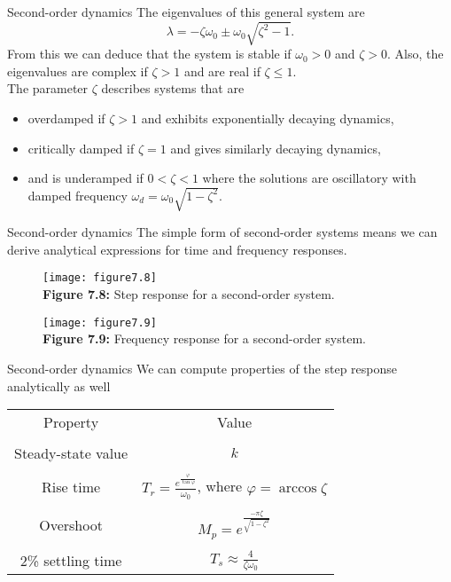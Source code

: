 \documentclass{beamer-control}
\begin{document}
\begin{frame}{Second-order dynamics}
The eigenvalues of this general system are 
\[\lambda=-\zeta \omega_0 \pm \omega_0 \sqrt{\zeta^2-1}.\]	
From this we can deduce that the system is stable if $\omega_0>0$ and $\zeta>0$. Also, the eigenvalues are complex if $\zeta>1$ and are real if $\zeta\leq 1$.\\

The parameter $\zeta$ describes systems that are
\begin{itemize}
	\item overdamped if $\zeta>1$ and exhibits exponentially decaying dynamics,
	\item critically damped if $\zeta=1$ and gives similarly decaying dynamics, 
	\item and is underamped if $0<\zeta < 1$ where the solutions are oscillatory with damped frequency $\omega_d=\omega_0\sqrt{1-\zeta^2}$.
\end{itemize}
\end{frame}

\begin{frame}{Second-order dynamics}
The simple form of second-order systems means we can derive analytical expressions for time and frequency responses.
\begin{figure}
	\centering
	\texttt{[image: figure7.8]}
	\\
	\textbf{Figure 7.8:} Step response for a second-order system.
\end{figure}
\begin{figure}
	\centering
	\texttt{[image: figure7.9]}
	\\
	\textbf{Figure 7.9:} Frequency response for a second-order system.
\end{figure}
\end{frame}


\begin{frame}{Second-order dynamics}
We can compute properties of the step response analytically as well

\begin{center}
	\begin{tabular}{|c|c|}
	\hline
	Property & Value\\ & \\
	\hline
	Steady-state value & $k$ \\  & \\
	Rise time & $T_r=\frac{e^\frac{\varphi}{\tan \varphi}}{\omega_0}$, where $\varphi=\arccos \zeta$ \\ & \\
	Overshoot & $M_p=e^{\frac{-\pi \zeta}{\sqrt{1-\zeta^2}}}$ \\ & \\
	2\% settling time & $T_s\approx \frac{4}{\zeta \omega_0}$
	\\
	\hline
\end{tabular}
\end{center}
\end{frame}
\end{document}
